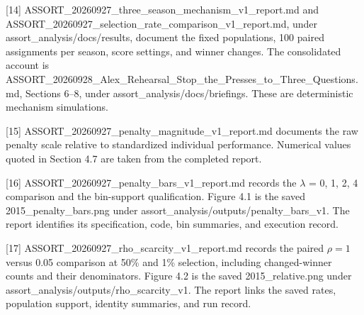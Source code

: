 {[}14{]} ASSORT\_\allowbreak{}20260927\_\allowbreak{}three\_\allowbreak{}season\_\allowbreak{}mechanism\_\allowbreak{}v1\_\allowbreak{}report.md and ASSORT\_\allowbreak{}20260927\_\allowbreak{}selection\_\allowbreak{}rate\_\allowbreak{}comparison\_\allowbreak{}v1\_\allowbreak{}report.md, under assort\_\allowbreak{}analysis/docs/results, document the fixed populations, 100 paired assignments per season, score settings, and winner changes. The consolidated account is ASSORT\_\allowbreak{}20260928\_\allowbreak{}Alex\_\allowbreak{}Rehearsal\_\allowbreak{}Stop\_\allowbreak{}the\_\allowbreak{}Presses\_\allowbreak{}to\_\allowbreak{}Three\_\allowbreak{}Questions.md, Sections 6--8, under assort\_\allowbreak{}analysis/docs/briefings. These are deterministic mechanism simulations.

{[}15{]} ASSORT\_\allowbreak{}20260927\_\allowbreak{}penalty\_\allowbreak{}magnitude\_\allowbreak{}v1\_\allowbreak{}report.md documents the raw penalty scale relative to standardized individual performance. Numerical values quoted in Section 4.7 are taken from the completed report.

{[}16{]} ASSORT\_\allowbreak{}20260927\_\allowbreak{}penalty\_\allowbreak{}bars\_\allowbreak{}v1\_\allowbreak{}report.md records the \(\lambda\) = 0, 1, 2, 4 comparison and the bin-support qualification. Figure 4.1 is the saved 2015\_\allowbreak{}penalty\_\allowbreak{}bars.png under assort\_\allowbreak{}analysis/outputs/penalty\_\allowbreak{}bars\_\allowbreak{}v1. The report identifies its specification, code, bin summaries, and execution record.

{[}17{]} ASSORT\_\allowbreak{}20260927\_\allowbreak{}rho\_\allowbreak{}scarcity\_\allowbreak{}v1\_\allowbreak{}report.md records the paired \(\rho=1\) versus 0.05 comparison at 50\% and 1\% selection, including changed-winner counts and their denominators. Figure 4.2 is the saved 2015\_\allowbreak{}relative.png under assort\_\allowbreak{}analysis/outputs/rho\_\allowbreak{}scarcity\_\allowbreak{}v1. The report links the saved rates, population support, identity summaries, and run record.
